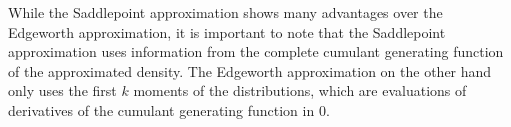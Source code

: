 While the Saddlepoint approximation shows many advantages over the Edgeworth approximation, it is important to note that the Saddlepoint approximation uses information from the complete cumulant generating function of the approximated density. The Edgeworth approximation on the other hand only uses the first $k$ moments of the distributions, which are evaluations of derivatives of the cumulant generating function in 0. 

\begin{example}

\end{example}